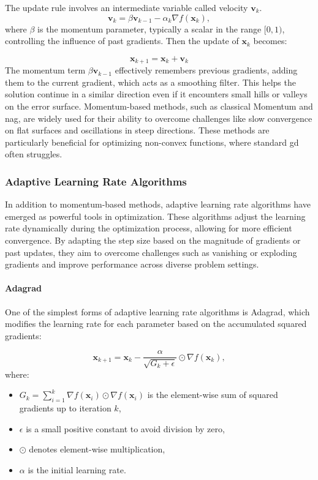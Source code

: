 The update rule involves an intermediate variable called velocity $\mathbf{v}_k$.
\begin{equation*}
   \mathbf{v}_k = \beta \mathbf{v}_{k-1} - \alpha_k \nabla f(\mathbf{x}_k),
   \label{eq:momentum_v}
\end{equation*}
where $\beta$ is the momentum parameter, typically a scalar in the range \( [0, 1) \), controlling the influence of past gradients. Then the update of $\mathbf{x}_k$ becomes:

\begin{equation*}
\mathbf{x}_{k+1} = \mathbf{x}_k + \mathbf{v}_k
\label{eq:momentum_update}
\end{equation*}
The momentum term $\beta \mathbf{v}_{k-1}$ effectively remembers previous gradients, adding them to the current gradient, which acts as a smoothing filter. This helps the solution continue in a similar direction even if it encounters small hills or valleys on the error surface. Momentum-based methods, such as classical Momentum and \ac{nag}, are widely used for their ability to overcome challenges like slow convergence on flat surfaces and oscillations in steep directions. These methods are particularly beneficial for optimizing non-convex functions, where standard \ac{gd} often struggles.

\subsubsection{Adaptive Learning Rate Algorithms}
\label{subsubsection:adaptive_learning_rates}
In addition to momentum-based methods, adaptive learning rate algorithms have emerged as powerful tools in optimization. These algorithms adjust the learning rate dynamically during the optimization process, allowing for more efficient convergence. By adapting the step size based on the magnitude of gradients or past updates, they aim to overcome challenges such as vanishing or exploding gradients and improve performance across diverse problem settings.

\paragraph{Adagrad}
One of the simplest forms of adaptive learning rate algorithms is Adagrad, which modifies the learning rate for each parameter based on the accumulated squared gradients:

\[
\mathbf{x}_{k+1} = \mathbf{x}_k - \frac{\alpha}{\sqrt{G_k + \epsilon}} \odot \nabla f(\mathbf{x}_k),
\]
where:
\begin{itemize}
    \item \( G_k = \sum_{i=1}^k \nabla f(\mathbf{x}_i) \odot \nabla f(\mathbf{x}_i) \) is the element-wise sum of squared gradients up to iteration \( k \),
    \item \( \epsilon \) is a small positive constant to avoid division by zero,
    \item \( \odot \) denotes element-wise multiplication,
    \item \( \alpha \) is the initial learning rate.
\end{itemize}


